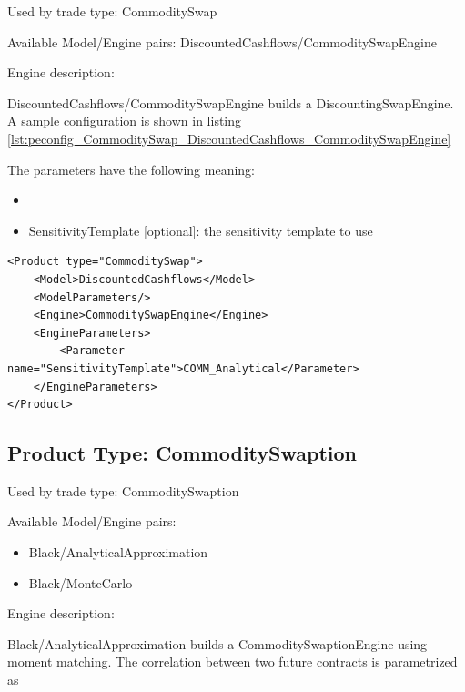 Used by trade type: CommoditySwap

Available Model/Engine pairs: DiscountedCashflows/CommoditySwapEngine

Engine description:

DiscountedCashflows/CommoditySwapEngine builds a DiscountingSwapEngine. A sample configuration is shown in listing
\ref{lst:peconfig_CommoditySwap_DiscountedCashflows_CommoditySwapEngine}

The parameters have the following meaning:

\begin{itemize}
\item
\item SensitivityTemplate [optional]: the sensitivity template to use
\end{itemize}

\begin{longlisting}
\begin{verbatim}
<Product type="CommoditySwap">
    <Model>DiscountedCashflows</Model>
    <ModelParameters/>
    <Engine>CommoditySwapEngine</Engine>
    <EngineParameters>
        <Parameter name="SensitivityTemplate">COMM_Analytical</Parameter>
    </EngineParameters>
</Product>
\end{verbatim}
\caption{Configuration for Product CommoditySwap, Model DiscountedCashflows, Engine CommoditySwapEngine}
\label{lst:peconfig_CommoditySwap_DiscountedCashflows_CommoditySwapEngine}
\end{longlisting}

\subsection{Product Type: CommoditySwaption}

Used by trade type: CommoditySwaption

Available Model/Engine pairs:

\begin{itemize}
\item Black/AnalyticalApproximation
\item Black/MonteCarlo
\end{itemize}

Engine description:

Black/AnalyticalApproximation builds a CommoditySwaptionEngine using moment matching. The correlation between two future
contracts is parametrized as

